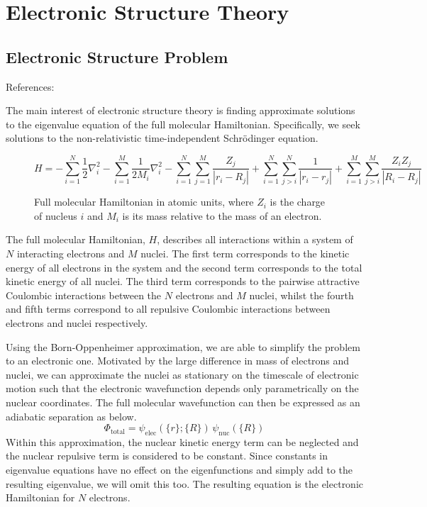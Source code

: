 \section{Electronic Structure Theory}

\subsection{Electronic Structure Problem}
References: \cite{Atilla1996}

The main interest of electronic structure theory is finding approximate solutions to the eigenvalue equation of the full molecular Hamiltonian. Specifically, we seek solutions to the non-relativistic time-independent Schrödinger equation.
\begin{figure}[H]
\centering
\begin{equation*}
    H =
    - \sum_{i=1}^{N} \frac{1}{2} \nabla^{2}_{i}
    - \sum_{i=1}^{M} \frac{1}{2M_i} \nabla^{2}_{i}
    - \sum_{i=1}^{N} \sum_{j=1}^{M} \frac{Z_j}{|r_{i} - R_{j}|}
    + \sum_{i=1}^{N} \sum_{j>i}^{N} \frac{1}{|r_{i} - r_{j}|}
    + \sum_{i=1}^{M} \sum_{j>i}^{M} \frac{Z_{i} Z_{j}}{|R_{i} - R_{j}|}
\end{equation*}
\caption{Full molecular Hamiltonian in atomic units, where $Z_i$ is the charge of nucleus $i$ and $M_i$ is its mass relative to the mass of an electron.}
\end{figure}
The full molecular Hamiltonian, $H$, describes all interactions within a system of $N$ interacting electrons and $M$ nuclei. The first term corresponds to the kinetic energy of all electrons in the system and the second term corresponds to the total kinetic energy of all nuclei. The third term corresponds to the pairwise attractive Coulombic interactions between the $N$ electrons and $M$ nuclei, whilst the fourth and fifth terms correspond to all repulsive Coulombic interactions between electrons and nuclei respectively.

Using the Born-Oppenheimer approximation, we are able to simplify the problem to an electronic one. Motivated by the large difference in mass of electrons and nuclei, we can approximate the nuclei as stationary on the timescale of electronic motion such that the electronic wavefunction depends only parametrically on the nuclear coordinates. The full molecular wavefunction can then be expressed as an adiabatic separation as below.
\begin{equation*}
    \Phi_\text{total} =
    \psi_\text{elec}({\{r\}};\{R\}) \,
    \psi_\text{nuc}(\{R\})
\end{equation*}
Within this approximation, the nuclear kinetic energy term can be neglected and the nuclear repulsive term is considered to be constant. Since constants in eigenvalue equations have no effect on the eigenfunctions and simply add to the resulting eigenvalue, we will omit this too. The resulting equation is the electronic Hamiltonian for $N$ electrons. 

